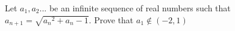 Let $a_1, a_2... $ be an infinite sequence of real numbers such that $a_{n+1}=\sqrt{{a_n}^2+a_n-1}$. Prove that $a_1  \notin (-2,1)$

